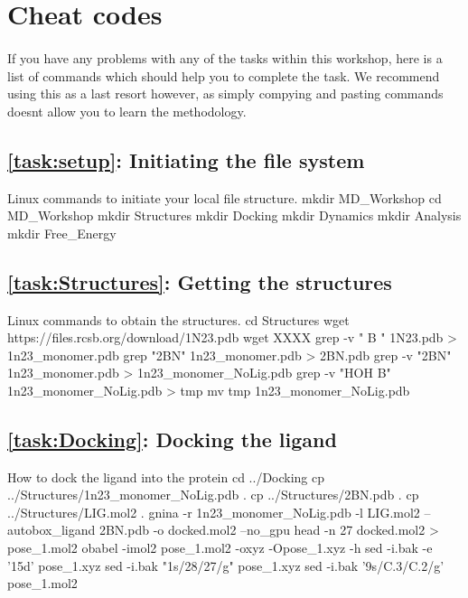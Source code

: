 \newpage
\section{Cheat codes}
    \paragraph{}
    If you have any problems with any of the tasks within this workshop, here is a list of commands which should help you to complete the task. We recommend using this as a last resort however,
    as simply compying and pasting commands doesnt allow you to learn the methodology. 

    \subsection{\cref{task:setup}: Initiating the file system}
    \begin{bashcmd}[label=cmd:task1]{Linux commands to initiate your local file structure.}
    mkdir MD_Workshop
    cd MD_Workshop
    mkdir Structures
    mkdir Docking
    mkdir Dynamics
    mkdir Analysis
    mkdir Free_Energy
    \end{bashcmd}
    
    \subsection{\cref{task:Structures}: Getting the structures}
    \begin{bashcmd}[label=cmd:task2]{Linux commands to obtain the structures.}
    cd Structures
    wget https://files.rcsb.org/download/1N23.pdb
    wget XXXX
    grep -v " B " 1N23.pdb > 1n23_monomer.pdb
    grep "2BN" 1n23_monomer.pdb > 2BN.pdb
    grep -v "2BN" 1n23_monomer.pdb > 1n23_monomer_NoLig.pdb  
    grep -v "HOH B" 1n23_monomer_NoLig.pdb > tmp
    mv tmp 1n23_monomer_NoLig.pdb
    \end{bashcmd}

    \subsection{\cref{task:Docking}: Docking the ligand}
    \begin{bashcmd}[label=cmd:task3]{How to dock the ligand into the protein}
    cd ../Docking
    cp ../Structures/1n23_monomer_NoLig.pdb .
    cp ../Structures/2BN.pdb .
    cp ../Structures/LIG.mol2 .
    gnina -r 1n23_monomer_NoLig.pdb -l LIG.mol2 --autobox_ligand 2BN.pdb -o docked.mol2 --no_gpu
    head -n 27 docked.mol2 > pose_1.mol2
    obabel -imol2 pose_1.mol2 -oxyz -Opose_1.xyz -h
    sed -i.bak -e '15d' pose_1.xyz 
    sed -i.bak "1s/28/27/g" pose_1.xyz
    sed -i.bak '9s/C.3/C.2/g' pose_1.mol2
    \end{bashcmd}

